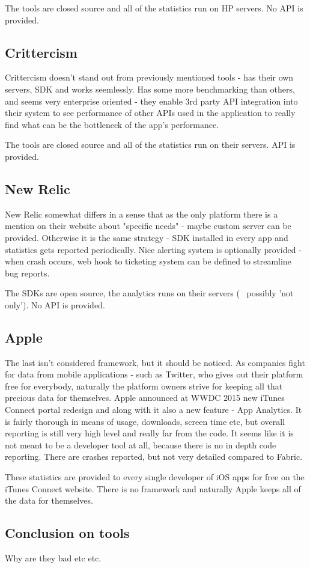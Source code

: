 The tools are closed source and all of the statistics run on HP servers. No API is provided.


\subsection{Crittercism}

Crittercism doesn't stand out from previously mentioned tools - has their own servers, SDK and works seemlessly. Has some more benchmarking than others, and seems very enterprise oriented - they enable 3rd party API integration into their system to see performance of other APIs used in the application to really find what can be the bottleneck of the app's performance.

The tools are closed source and all of the statistics run on their servers. API is provided.


\subsection{New Relic}

New Relic somewhat differs in a sense that as the only platform there is a mention on their website about "specific needs" - maybe custom server can be provided. Otherwise it is the same strategy - SDK installed in every app and statistics gets reported periodically. Nice alerting system is optionally provided - when crash occurs, web hook to ticketing system can be defined to streamline bug reports.

The SDKs are open source, the analytics runs on their servers (~ possibly 'not only'). No API is provided.


\subsection{Apple}

The last isn't considered framework, but it should be noticed. As companies fight for data from mobile applications - such as Twitter, who gives out their platform free for everybody, naturally the platform owners strive for keeping all that precious data for themselves. Apple announced at WWDC 2015 new iTunes Connect portal redesign and along with it also a new feature - App Analytics. It is fairly thorough in means of usage, downloads, screen time etc, but overall reporting is still very high level and really far from the code. It seems like it is not meant to be a developer tool at all, because there is no in depth code reporting. There are crashes reported, but not very detailed compared to Fabric.

These statistics are provided to every single developer of iOS apps for free on the iTunes Connect website. There is no framework and naturally Apple keeps all of the data for themselves.


\subsection*{Conclusion on tools}

Why are they bad etc etc.